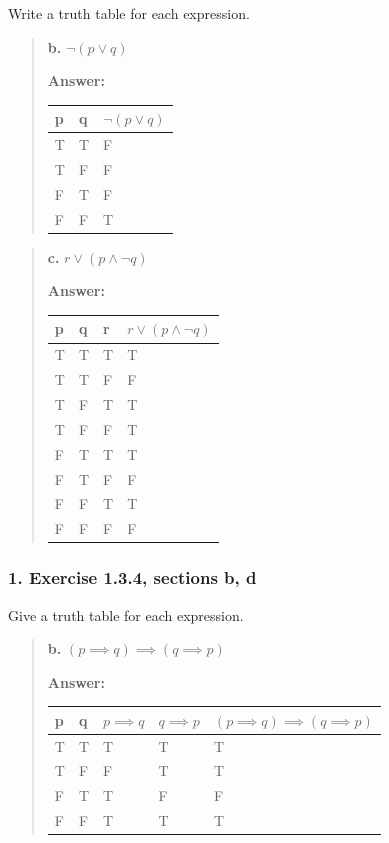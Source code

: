 \documentclass[11pt, oneside]{article}
\begin{document}
Write a truth table for each expression.

\begin{quote}
\textbf{b. }$\neg(p \lor q)$

\textbf{Answer:}

\begin{tabular}{ |p{0.5cm}|p{0.5cm}|p{1.5cm}|  }
    \hline
    p & q & $\neg(p \lor q)$ \\
    \hline
    T & T & F \\
    T & F & F \\
    F & T & F \\
    F & F & T \\
    \hline
\end{tabular}
\end{quote}

\begin{quote}
\textbf{c. }$r \lor (p \land \neg q)$

\textbf{Answer:}

\begin{tabular}{ |p{0.5cm}|p{0.5cm}|p{0.5cm}|p{3cm}|  }
    \hline
    p & q & r & $r \lor (p \land \neg q)$ \\
    \hline
    T & T & T & T \\
    T & T & F & F \\
    T & F & T & T \\
    T & F & F & T \\
    F & T & T & T \\
    F & T & F & F \\
    F & F & T & T \\
    F & F & F & F \\
    \hline
\end{tabular}
\end{quote}

\subsubsection*{1. Exercise 1.3.4, sections b, d}

Give a truth table for each expression.

\begin{quote}
\textbf{b. }$(p \implies q) \implies (q \implies p)$

\textbf{Answer:}

\begin{tabular}{ |p{0.5cm}|p{0.5cm}|p{2cm}|p{2cm}|p{5cm}|  }
    \hline
    p & q & $p \implies q$ & $q \implies p$ & $(p \implies q) \implies (q \implies p)$ \\
    \hline
    T & T & T & T & T \\
    T & F & F & T & T \\
    F & T & T & F & F \\
    F & F & T & T & T \\
    \hline
\end{tabular}
\end{quote}
\end{document}
